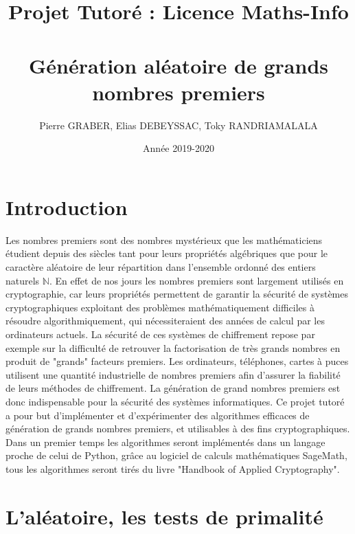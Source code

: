 \documentclass[a4paper,11pt]{article}
\title{Projet Tutoré : Licence Maths-Info
\section*{Génération aléatoire de grands nombres premiers }
\date{ Année 2019-2020}
}
\author{Pierre GRABER, Elias DEBEYSSAC, Toky RANDRIAMALALA}
\begin{document}
\maketitle

\section*{Introduction}
Les nombres premiers sont des nombres mystérieux que les mathématiciens étudient depuis des siècles tant pour leurs propriétés algébriques que pour le caractère  aléatoire de leur répartition dans l'ensemble ordonné des entiers naturels $\mathbb{N}$. En effet de nos jours les nombres premiers sont largement utilisés  en cryptographie, car  leurs propriétés permettent de garantir la sécurité de systèmes cryptographiques exploitant des problèmes mathématiquement difficiles à résoudre algorithmiquement, qui nécessiteraient des années de calcul par les ordinateurs actuels. \newline 
La sécurité de ces systèmes de chiffrement repose par exemple sur la difficulté de retrouver la factorisation de très grands nombres en produit de "grands" facteurs premiers. Les ordinateurs, téléphones, cartes à puces utilisent une quantité industrielle de nombres premiers afin d'assurer la fiabilité de leurs méthodes de chiffrement. La génération de grand nombres premiers est donc indispensable pour la sécurité des systèmes informatiques. Ce projet tutoré a pour but d'implémenter et d'expérimenter des algorithmes efficaces de génération de grands nombres premiers, et utilisables à des fins cryptographiques. Dans un premier temps les algorithmes seront implémentés dans un langage proche de celui de Python, grâce au logiciel de calculs mathématiques SageMath, tous les algorithmes seront tirés du livre "Handbook of Applied Cryptography".






\newpage
\tableofcontents


\newpage

\section{L'aléatoire, les tests de primalité}
\end{document}
